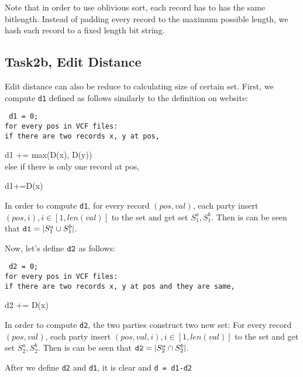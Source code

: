 Note that in order to use oblivious sort, each record has to has the same bitlength. Instead of padding every record to the maximum possible length, we hash each
record to a fixed length bit string.
\subsection{Task2b, Edit Distance}
Edit distance can also be reduce to calculating size of certain set. First, we compute {\tt d1} defined as follows similarly to the definition on website:\\
{\tt
d1 = 0;\\
for every pos in VCF files:\\
if there are two records x, y at pos,

d1 += max(D(x), D(y))\\
else if there is only one record at pos,

d1+=D(x)\\}

In order to compute {\tt d1}, for every record $(pos, val)$, each party insert $(pos, i), i\in[1, len(val)]$ to the set and get set $S_1^a, S_1^b$. Then is 
can be seen that ${\tt d1} = |S_1^a\cup S_1^b|$.

Now, let's define ${\tt d2}$ as follows:
{\tt
d2 = 0;\\
for every pos in VCF files:\\
if there are two records x, y at pos and they are same,

d2 += D(x)\\}
In order to compute {\tt d2}, the two parties construct two new set: For every record $(pos, val)$, each party insert $(pos,val, i), i\in[1, len(val)]$ to the set and get set $S_2^a, S_2^b$. Then is 
can be seen that ${\tt d2} = |S_2^a\cap S_2^b|$.

After we define {\tt d2} and {\tt d1}, it is clear and {\tt d = d1-d2}